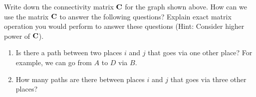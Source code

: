 \documentclass[9pt]{article}
\def\mf{\ensuremath\mathbf}
\begin{document}
\begin{multicols}{2}
\begin{enumerate}
    Write down the connectivity matrix $\mf{C}$ for the graph shown above. How can we use the matrix $\mf{C}$ to answer the following questions? Explain exact matrix operation you would perform to answer these questions (Hint: Consider higher power of $\mf{C}$).
    \begin{enumerate}
        \item Is there a path between two places $i$ and $j$ that goes via one other place? For example, we can go from $A$ to $D$ via $B$.
        \item How many paths are there between places $i$ and $j$ that goes via three other places?
    \end{enumerate}
\end{enumerate}

\end{multicols}
\end{document}
